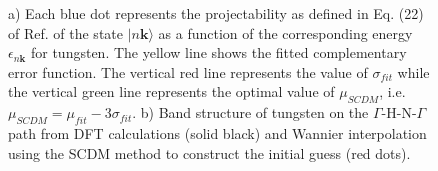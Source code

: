 \documentclass[a4paper,11pt,twoside]{article}
\begin{document}
\begin{figure}
\centering
{}
\caption{ a) Each blue dot represents the projectability as defined in Eq. (22) of Ref. \cite{Vitale2019automated}  of the state
$\vert n\mathbf{k} \rangle$ as a function of the corresponding energy $\epsilon_{n\mathbf{k}}$ for tungsten. The yellow line shows the fitted complementary error function. The vertical red line represents the value of $\sigma_{fit}$ while the vertical green line represents the optimal value of $\mu_{SCDM}$, i.e. $\mu_{SCDM} = \mu_{fit} - 3\sigma_{fit}$. b) Band structure of tungsten on the $\Gamma$-H-N-$\Gamma$ path from DFT calculations (solid black) and Wannier interpolation using the SCDM method to construct the initial guess (red dots).}
\label{fig:W_fit}
\end{figure}

\end{document}
